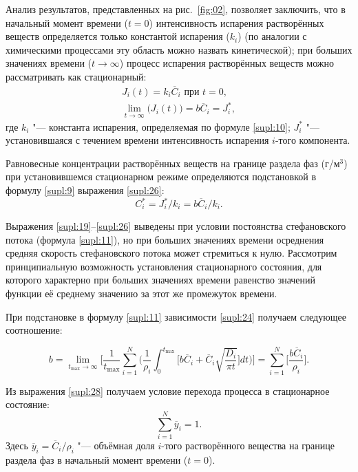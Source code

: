 Анализ результатов, представленных на рис.~\ref{fig:02}, позволяет заключить, что в начальный момент времени ($t = 0$) интенсивность испарения растворённых веществ определяется только константой испарения ($k_i$) (по аналогии с химическими процессами эту область можно назвать кинетической); при больших значениях времени ($t \to \infty$) процесс испарения растворённых веществ можно рассматривать как стационарный:
\begin{gather}%
J_i(t) = k_i \overline{C}_i \text{ при } t = 0,
\label{supl:26}
\\
\lim \limits_{t \to \infty} \big(J_i(t)\big) =b \overline{C}_i = J_i^*,
\label{supl:26}
\end{gather} 
где $k_i$ "--- константа испарения, определяемая по формуле \eqref{supl:10};  
$J_i^*$ "--- установившаяся с течением времени интенсивность испарения $i$-того компонента.

Равновесные концентрации растворённых веществ на границе раздела фаз (г/м$^3$) при установившемся стационарном режиме определяются подстановкой в формулу \eqref{supl:9}  выражения \eqref{supl:26}:
\begin{equation}%
C_i^*=J_i^*/k_i=b \overline{C}_i/k_i.
\label{supl:27}
\end{equation}

Выражения \eqref{supl:19}--\eqref{supl:26} выведены при условии постоянства стефановского потока (формула \eqref{supl:11}), но при больших значениях времени осреднения средняя скорость стефановского потока может стремиться к нулю. Рассмотрим принципиальную возможность установления стационарного состояния, для которого характерно при больших значениях времени равенство значений функции её среднему значению за этот же промежуток времени.

При подстановке в формулу \eqref{supl:11} зависимости \eqref{supl:24} получаем следующее соотношение:

\begin{equation}%
b= \lim \limits_{t_{\max} \to \infty} 
\biggl[
    \frac{1}{t_{\max}}\sum \limits_{i=1}^{N} 
       \bigg (\frac{1}{\rho_i} \int _{0}^{t_{\max}} \bigg [
            b \overline{C}_i + \overline{C}_i \sqrt{\frac{D_i}{\pi t}} \bigg ]dt
       \bigg ) 
\biggr] = \sum \limits_{i=1}^{N} \bigg[\frac{b \overline{C}_i}{\rho_i} \bigg ].
\label{supl:28}
\end{equation}

Из выражения \eqref{supl:28} получаем условие перехода процесса в стационарное состояние:
\begin{equation}%
\sum \limits_{i=1}^{N} \overline{y}_i =1.
\label{supl:29}
\end{equation}
Здесь $ \overline{y}_i=\overline{C}_i/\rho_i$  "--- объёмная доля $i$-того растворённого вещества на границе раздела фаз в начальный момент времени ($t = 0$).

